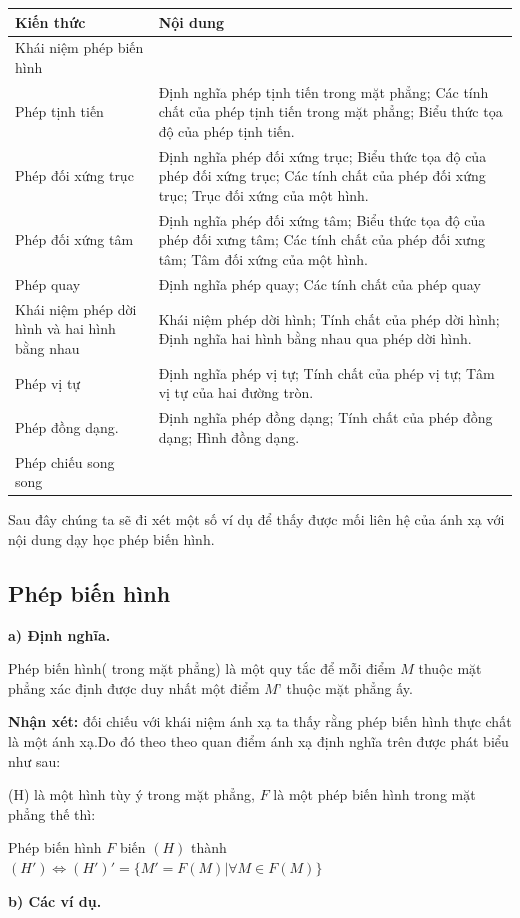 \documentclass[12pt,oneside,a4paper,reqno]{book}
\begin{document}
\begin{tabular}{|p{4.5cm}|p{9cm}|}
\hline
\textbf{Kiến thức } & \textbf{Nội dung} \tabularnewline
\hline
Khái niệm phép biến hình  &  \tabularnewline
\hline
  Phép tịnh tiến & Định nghĩa phép tịnh tiến trong mặt phẳng; Các tính chất của phép tịnh tiến trong mặt phẳng; Biểu thức tọa độ của phép tịnh tiến.   \tabularnewline 
   \hline
Phép đối xứng trục& Định nghĩa phép đối xứng trục; Biểu thức tọa độ của phép đối xứng trục; Các tính chất của phép đối xứng trục; Trục đối xứng của một hình. \tabularnewline

\hline
Phép đối xứng tâm&Định nghĩa phép đối xứng tâm; Biểu thức tọa độ của phép đối xưng tâm; Các tính chất của phép đối xưng tâm; Tâm đối xứng của một hình. \tabularnewline
\hline
Phép quay&Định nghĩa phép quay; Các tính chất của phép quay \tabularnewline 
\hline
Khái niệm phép dời hình và hai hình bằng nhau&Khái niệm phép dời hình; Tính chất của phép dời hình; Định nghĩa hai hình bằng nhau qua phép dời hình. \tabularnewline
\hline 
Phép vị tự&Định nghĩa phép vị tự; Tính chất của phép vị tự; Tâm vị tự của hai đường tròn. \tabularnewline
\hline
Phép đồng dạng.&Định nghĩa phép đồng dạng; Tính chất của phép đồng dạng; Hình đồng dạng. \tabularnewline
\hline
Phép chiếu song song& \tabularnewline
\hline
\end{tabular}

Sau đây chúng ta sẽ đi xét một số ví dụ để thấy được mối liên hệ của ánh xạ với nội dung dạy học phép biến hình.

\subsection{Phép biến hình}
\textbf{a) Định nghĩa.}

Phép biến hình( trong mặt phẳng) là một quy tắc để mỗi điểm $M$ thuộc mặt phẳng xác định được duy nhất một điểm $M’$ thuộc mặt phẳng ấy.

\textbf{Nhận xét:} đối chiếu với khái niệm ánh xạ ta thấy rằng phép biến hình thực chất là một ánh xạ.Do đó theo theo quan điểm ánh xạ định nghĩa trên được phát biểu như sau: 

(H) là một hình tùy ý trong mặt phẳng, $F$ là một phép biến hình trong mặt phẳng thế thì: 

\centerline {}

Phép biến hình  $F$ biến $(H)$ thành $(H') \Leftrightarrow (H') '=\{M'=F(M)|\forall M\in F(M)\}$

\textbf{b) Các ví dụ.}
\end{document}
